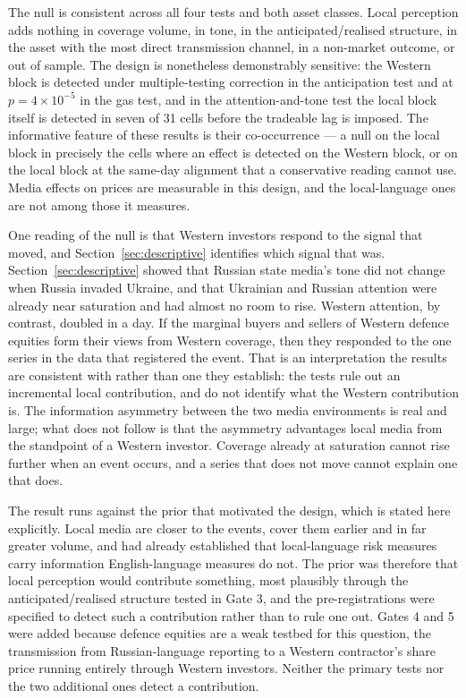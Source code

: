 \documentclass[12pt,a4paper]{article}
\begin{document}
The null is consistent across all four tests and both asset classes. Local perception adds nothing in coverage volume, in tone, in the anticipated/realised structure, in the asset with the most direct transmission channel, in a non-market outcome, or out of sample. The design is nonetheless demonstrably sensitive: the Western block is detected under multiple-testing correction in the anticipation test and at $p = 4\times10^{-5}$ in the gas test, and in the attention-and-tone test the local block itself is detected in seven of 31 cells before the tradeable lag is imposed. The informative feature of these results is their co-occurrence --- a null on the local block in precisely the cells where an effect is detected on the Western block, or on the local block at the same-day alignment that a conservative reading cannot use. Media effects on prices are measurable in this design, and the local-language ones are not among those it measures.

One reading of the null is that Western investors respond to the signal that moved, and Section~\ref{sec:descriptive} identifies which signal that was. Section~\ref{sec:descriptive} showed that Russian state media's tone did not change when Russia invaded Ukraine, and that Ukrainian and Russian attention were already near saturation and had almost no room to rise. Western attention, by contrast, doubled in a day. If the marginal buyers and sellers of Western defence equities form their views from Western coverage, then they responded to the one series in the data that registered the event. That is an interpretation the results are consistent with rather than one they establish: the tests rule out an incremental local contribution, and do not identify what the Western contribution is. The information asymmetry between the two media environments is real and large; what does not follow is that the asymmetry advantages local media from the standpoint of a Western investor. Coverage already at saturation cannot rise further when an event occurs, and a series that does not move cannot explain one that does.

The result runs against the prior that motivated the design, which is stated here explicitly. Local media are closer to the events, cover them earlier and in far greater volume, and \citet{bondarenko2024} had already established that local-language risk measures carry information English-language measures do not. The prior was therefore that local perception would contribute something, most plausibly through the anticipated/realised structure tested in Gate 3, and the pre-registrations were specified to detect such a contribution rather than to rule one out. Gates 4 and 5 were added because defence equities are a weak testbed for this question, the transmission from Russian-language reporting to a Western contractor's share price running entirely through Western investors. Neither the primary tests nor the two additional ones detect a contribution.
\end{document}
